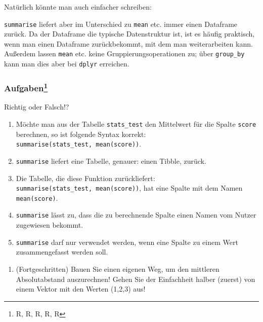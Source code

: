 \documentclass[12pt,ngerman,]{book}
\makeatletter
\newenvironment{Shaded}{\begin{snugshade}}{\end{snugshade}}
\newcommand{\KeywordTok}[1]{\textcolor[rgb]{0.13,0.29,0.53}{\textbf{{#1}}}}
\newcommand{\CommentTok}[1]{\textcolor[rgb]{0.56,0.35,0.01}{\textit{{#1}}}}
\newcommand{\NormalTok}[1]{{#1}}
\providecommand{\tightlist}{%
  \setlength{\itemsep}{0pt}\setlength{\parskip}{0pt}}
\let\rmarkdownfootnote\footnote%
\def\footnote{\protect\rmarkdownfootnote}
\newenvironment{kframe}{%
\medskip{}
\setlength{\fboxsep}{.8em}
 \def\at@end@of@kframe{}%
 \ifinner\ifhmode%
  \def\at@end@of@kframe{\end{minipage}}%
  \begin{minipage}{\columnwidth}%
 \fi\fi%
 \def\FrameCommand##1{\hskip\@totalleftmargin \hskip-\fboxsep
 \colorbox{shadecolor}{##1}\hskip-\fboxsep
     \hskip-\linewidth \hskip-\@totalleftmargin \hskip\columnwidth}%
 \MakeFramed {\advance\hsize-\width
   \@totalleftmargin\z@ \linewidth\hsize
   \@setminipage}}%
 {\par\unskip\endMakeFramed%
 \at@end@of@kframe}
\renewenvironment{Shaded}{\begin{kframe}}{\end{kframe}}
\let\BeginKnitrBlock\begin \let\EndKnitrBlock\end
\makeatother
\begin{document}
Natürlich könnte man auch einfacher schreiben:

\begin{Shaded}
\end{Shaded}

\texttt{summarise} liefert aber im Unterschied zu \texttt{mean} etc.
immer einen Dataframe zurück. Da der Dataframe die typische
Datenstruktur ist, ist es häufig praktisch, wenn man einen Dataframe
zurückbekommt, mit dem man weiterarbeiten kann. Außerdem lassen
\texttt{mean} etc. keine Gruppierungsoperationen zu; über
\texttt{group\_by} kann man dies aber bei \texttt{dplyr} erreichen.

\subsubsection[Aufgaben]{\texorpdfstring{Aufgaben\footnote{R, R, R, R, R}}{Aufgaben}}\label{aufgaben-7}

\BeginKnitrBlock{rmdexercises}
Richtig oder Falsch!?

\begin{enumerate}
\def\labelenumi{\arabic{enumi}.}
\tightlist
\item
  Möchte man aus der Tabelle \texttt{stats\_test} den Mittelwert für die
  Spalte \texttt{score} berechnen, so ist folgende Syntax korrekt:
  \texttt{summarise(stats\_test,\ mean(score))}.
\item
  \texttt{summarise} liefert eine Tabelle, genauer: einen Tibble,
  zurück.
\item
  Die Tabelle, die diese Funktion zurückliefert:
  \texttt{summarise(stats\_test,\ mean(score))}, hat eine Spalte mit dem
  Namen \texttt{mean(score)}.
\item
  \texttt{summarise} lässt zu, dass die zu berechnende Spalte einen
  Namen vom Nutzer zugewiesen bekommt.
\item
  \texttt{summarise} darf nur verwendet werden, wenn eine Spalte zu
  einem Wert zusammengefasst werden soll.
\end{enumerate}
\EndKnitrBlock{rmdexercises}

\begin{enumerate}
\def\labelenumi{\arabic{enumi}.}
\tightlist
\item
  (Fortgeschritten) Bauen Sie einen eigenen Weg, um den mittleren
  Absolutabstand auszurechnen! Gehen Sie der Einfachheit halber (zuerst)
  von einem Vektor mit den Werten (1,2,3) aus!
\end{enumerate}
\end{document}
